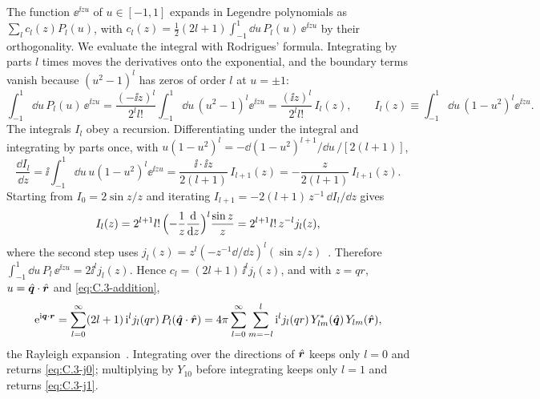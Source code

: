 The function $\ee^{\ii zu}$ of $u \in [-1, 1]$ expands in Legendre polynomials as $\sum_lc_l(z)P_l(u)$, with $c_l(z) = \tfrac12(2l + 1)\int_{-1}^{1}\dd u\,P_l(u)\,\ee^{\ii zu}$ by their orthogonality. We evaluate the integral with Rodrigues' formula. Integrating by parts $l$ times moves the derivatives onto the exponential, and the boundary terms vanish because $(u^2 - 1)^l$ has zeros of order $l$ at $u = \pm1$:
\begin{equation*}
  \int_{-1}^{1}\dd u\,P_l(u)\,\ee^{\ii zu} = \frac{(-\ii z)^l}{2^ll!}\int_{-1}^{1}\dd u\,(u^2 - 1)^l\ee^{\ii zu} = \frac{(\ii z)^l}{2^ll!}\,I_l(z), \qquad I_l(z) \equiv \int_{-1}^{1}\dd u\,(1 - u^2)^l\ee^{\ii zu} .
\end{equation*}
The integrals $I_l$ obey a recursion. Differentiating under the integral and integrating by parts once, with $u(1 - u^2)^l = -\dd(1 - u^2)^{l+1}/\dd u\,/[2(l + 1)]$,
\begin{equation*}
  \frac{\dd I_l}{\dd z} = \ii\int_{-1}^{1}\dd u\,u(1 - u^2)^l\ee^{\ii zu} = \frac{\ii\cdot\ii z}{2(l + 1)}\,I_{l+1}(z) = -\frac{z}{2(l + 1)}\,I_{l+1}(z) .
\end{equation*}
Starting from $I_0 = 2\sin z/z$ and iterating $I_{l+1} = -2(l + 1)\,z^{-1}\,\dd I_l/\dd z$ gives
\begin{equation*}
  I_l(z) = 2^{l+1}l!\,\Bigl(-\frac{1}{z}\frac{\mathrm{d}}{\mathrm{d} z}\Bigr)^l\frac{\sin z}{z} = 2^{l+1}l!\,z^{-l}j_l(z) ,
\end{equation*}
where the second step uses $j_l(z) = z^l(-z^{-1}\dd/\dd z)^l(\sin z/z)$~\cite[Eq.~(10.49.14)]{olver2010nist}. Therefore $\int_{-1}^{1}\dd u\,P_l\,\ee^{\ii zu} = 2\ii^lj_l(z)$. Hence $c_l = (2l + 1)\,\ii^l j_l(z)$, and with $z = qr$, $u = \hat{\bm{q}}\cdot\hat{\bm{r}}$ and \cref{eq:C.3-addition},
\begin{equation}
  \mathrm{e}^{\mathrm{i}\bm{q}\cdot\bm{r}} = \sum_{l=0}^{\infty}(2l + 1)\,\mathrm{i}^l j_l(qr)\,P_l(\hat{\bm{q}}\cdot\hat{\bm{r}})
  = 4\pi\sum_{l=0}^{\infty}\sum_{m=-l}^{l}\mathrm{i}^l j_l(qr)\,Y_{lm}^*(\hat{\bm{q}})\,Y_{lm}(\hat{\bm{r}}) ,
  \label{eq:C.3-planewave}
\end{equation}
the Rayleigh expansion~\cite[Eq.~(10.60.7)]{olver2010nist}. Integrating over the directions of $\hat{\bm{r}}$ keeps only $l = 0$ and returns \cref{eq:C.3-j0}; multiplying by $Y_{10}$ before integrating keeps only $l = 1$ and returns \cref{eq:C.3-j1}.

